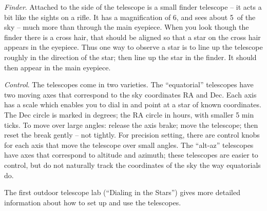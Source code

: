 \medskip \noindent \emph{Finder}. Attached to the side of the
telescope is a small finder telescope -- it acts a bit like the sights
on a rifle. It has a magnification of 6, and sees about 5\deg\ of the
sky -- much more than through the main eyepiece. When you look though
the finder there is a cross hair, that should be aligned so that a
star on the cross hair appears in the eyepiece. Thus one way to
observe a star is to line up the telescope roughly in the direction of
the star; then line up the star in the finder. It should then appear
in the main eyepiece.

\medskip \noindent \emph{Control}. The telescopes come in two
varieties.  The ``equatorial'' telescopes have two moving axes that
correspond to the sky coordinates RA and Dec. Each axis has a scale
which enables you to dial in and point at a star of known
coordinates. The Dec circle is marked in degrees; the RA circle in
hours, with smaller 5 min ticks. To move over large angles: release
the axis brake; move the telescope; then reset the break gently -- not
tightly. For precision setting, there are control knobs for each axis
that move the telescope over small angles. The ``alt-az'' telescopes
have axes that correspond to altitude and azimuth; these telescopes
are easier to control, but do not naturally track the coordinates of
the sky the way equatorials do.

The first outdoor telescope lab (``Dialing in the Stars'') gives more
detailed information about how to set up and use the telescopes.
